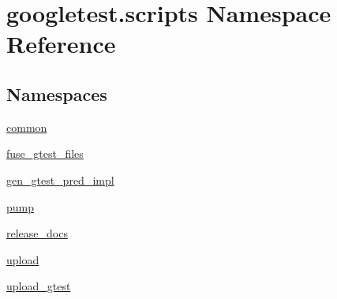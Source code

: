 \hypertarget{namespacegoogletest_1_1scripts}{}\section{googletest.\+scripts Namespace Reference}
\label{namespacegoogletest_1_1scripts}
\subsection*{Namespaces}
\begin{DoxyCompactItemize}
\item 
 \mbox{\hyperlink{namespacegoogletest_1_1scripts_1_1common}{common}}
\item 
 \mbox{\hyperlink{namespacegoogletest_1_1scripts_1_1fuse__gtest__files}{fuse\+\_\+gtest\+\_\+files}}
\item 
 \mbox{\hyperlink{namespacegoogletest_1_1scripts_1_1gen__gtest__pred__impl}{gen\+\_\+gtest\+\_\+pred\+\_\+impl}}
\item 
 \mbox{\hyperlink{namespacegoogletest_1_1scripts_1_1pump}{pump}}
\item 
 \mbox{\hyperlink{namespacegoogletest_1_1scripts_1_1release__docs}{release\+\_\+docs}}
\item 
 \mbox{\hyperlink{namespacegoogletest_1_1scripts_1_1upload}{upload}}
\item 
 \mbox{\hyperlink{namespacegoogletest_1_1scripts_1_1upload__gtest}{upload\+\_\+gtest}}
\end{DoxyCompactItemize}
